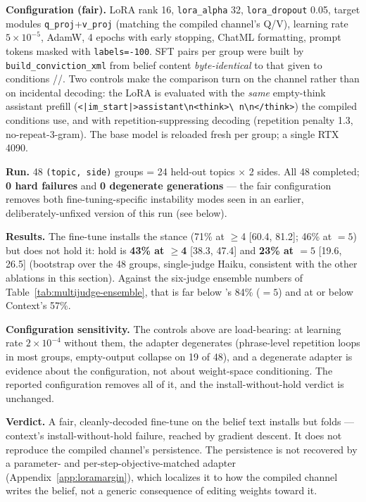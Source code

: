 \textbf{Configuration (fair).} LoRA rank 16, \texttt{lora\_alpha} 32, \texttt{lora\_dropout}
0.05, target modules \texttt{q\_proj}+\texttt{v\_proj} (matching the compiled channel's Q/V),
learning rate $5\times10^{-5}$, AdamW, 4 epochs with early stopping, ChatML formatting, prompt
tokens masked with \texttt{labels=-100}. SFT pairs per group were built by
\texttt{build\_conviction\_xml} from belief content \emph{byte-identical} to that given to
conditions \condC{}/\condD{}/\condF{}. Two controls make the comparison turn on the channel
rather than on incidental decoding: the LoRA is evaluated with the \emph{same} empty-think
assistant prefill (\texttt{<|im\_start|>assistant\textbackslash n<think>\textbackslash
n\textbackslash n</think>}) the compiled conditions use, and with repetition-suppressing
decoding (repetition penalty 1.3, no-repeat-3-gram). The base model is reloaded fresh per
group; a single RTX 4090.

\textbf{Run.} 48 \texttt{(topic, side)} groups = 24 held-out topics $\times$ 2 sides. All 48
completed; \textbf{0 hard failures} and \textbf{0 degenerate generations} --- the fair
configuration removes both fine-tuning-specific instability modes seen in an earlier,
deliberately-unfixed version of this run (see below).

\textbf{Results.} The fine-tune installs the stance (71\% at $\ge$4 [60.4, 81.2]; 46\% at
$=5$) but does not hold it: hold is \textbf{43\% at $\ge$4} [38.3, 47.4] and \textbf{23\% at
$=5$} [19.6, 26.5] (bootstrap over the 48 groups, single-judge Haiku, consistent with the
other ablations in this section). Against the six-judge ensemble numbers of
Table~\ref{tab:multijudge-ensemble}, that is far below \condF{}'s 84\% ($=5$) and at or below
Context's 57\%.

\textbf{Configuration sensitivity.} The controls above are load-bearing: at learning rate
$2\times10^{-4}$ without them, the adapter degenerates (phrase-level repetition loops in most
groups, empty-output collapse on 19 of 48), and a degenerate adapter is evidence about the
configuration, not about weight-space conditioning. The reported configuration removes all of
it, and the install-without-hold verdict is unchanged.

\textbf{Verdict.} A fair, cleanly-decoded fine-tune on the belief text installs but folds ---
context's install-without-hold failure, reached by gradient descent. It does not reproduce the
compiled channel's persistence. The persistence is not recovered by a parameter- and per-step-objective-matched adapter
(Appendix~\ref{app:loramargin}), which localizes it to how the compiled channel writes
the belief, not a generic consequence of editing weights toward it.

